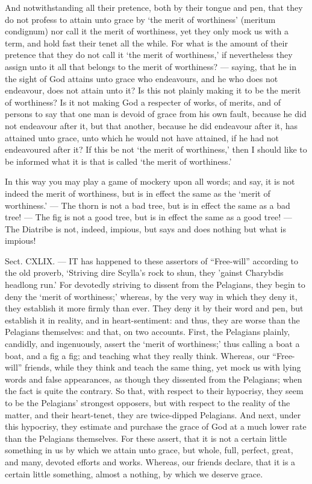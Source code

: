 And notwithstanding all their pretence, both by their tongue and pen, that they do not profess to attain unto grace by ‘the merit of worthiness’ (meritum condignum) nor call it the merit of worthiness, yet they only mock us with a term, and hold fast their tenet all the while. For what is the amount of their pretence that they do not call it ‘the merit of worthiness,’ if nevertheless they assign unto it all that belongs to the merit of worthiness? — saying, that he in the sight of God attains unto grace who endeavours, and he who does not endeavour, does not attain unto it? Is this not plainly making it to be the merit of worthiness? Is it not making God a respecter of works, of merits, and of persons to say that one man is devoid of grace from his own fault, because he did not endeavour after it, but that another, because he did endeavour after it, has attained unto grace, unto which he would not have attained, if he had not endeavoured after it? If this be not ‘the merit of worthiness,’ then I should like to be informed what it is that is called ‘the merit of worthiness.’

In this way you may play a game of mockery upon all words; and say, it is not indeed the merit of worthiness, but is in effect the same as the ‘merit of worthiness.’ — The thorn is not a bad tree, but is in effect the same as a bad tree! — The fig is not a good tree, but is in effect the same as a good tree! — The Diatribe is not, indeed, impious, but says and does nothing but what is impious!


Sect. CXLIX. — IT has happened to these assertors of “Free-will” according to the old proverb, ‘Striving dire Scylla’s rock to shun, they ’gainst Charybdis headlong run.’ For devotedly striving to dissent from the Pelagians, they begin to deny the ‘merit of worthiness;’ whereas, by the very way in which they deny it, they establish it more firmly than ever. They deny it by their word and pen, but establish it in reality, and in heart-sentiment: and thus, they are worse than the Pelagians themselves: and that, on two accounts. First, the Pelagians plainly, candidly, and ingenuously, assert the ‘merit of worthiness;’ thus calling a boat a boat, and a fig a fig; and teaching what they really think. Whereas, our “Free-will” friends, while they think and teach the same thing, yet mock us with lying words and false appearances, as though they dissented from the Pelagians; when the fact is quite the contrary. So that, with respect to their hypocrisy, they seem to be the Pelagians’ strongest opposers, but with respect to the reality of the matter, and their heart-tenet, they are twice-dipped Pelagians. And next, under this hypocrisy, they estimate and purchase the grace of God at a much lower rate than the Pelagians themselves. For these assert, that it is not a certain little something in us by which we attain unto grace, but whole, full, perfect, great, and many, devoted efforts and works. Whereas, our friends declare, that it is a certain little something, almost a nothing, by which we deserve grace.

